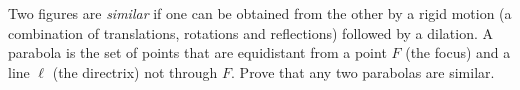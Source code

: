 Two figures are \emph{similar} if one can be obtained from the other by a rigid motion (a combination of translations, rotations and reflections) followed by a dilation. A parabola is the set of points that are equidistant from a point $F$ (the focus) and a line $\ell$ (the directrix) not through $F$. Prove that any two parabolas are similar.

